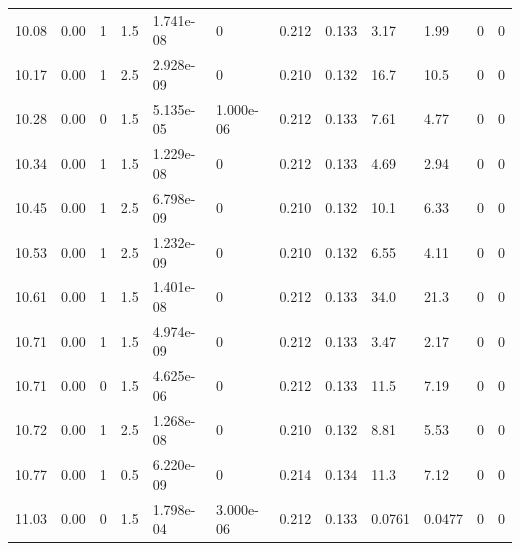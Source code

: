 \documentclass[preview]{standalone}
\begin{document}
{{{{\begin{tabular}{L{1.2cm}C{1.2cm} C{0.3cm}C{0.5cm} C{1.4cm}C{1.4cm} C{1.4cm}C{1.4cm} C{1.6cm}C{1.6cm} C{1.6cm}C{1.6cm}}
  10.08  &  0.00  & 1     & 1.5 &  1.741e-08  & 0  &  0.212&   0.133& 3.17 & 1.99   &  0 & 0  \\ 
  10.17  &  0.00  & 1     & 2.5 &  2.928e-09  & 0  &  0.210&   0.132& 16.7 & 10.5   &  0 & 0  \\ 
  10.28  &  0.00  & 0     & 1.5 &  5.135e-05  & 1.000e-06  &  0.212&   0.133& 7.61 & 4.77   &  0 & 0  \\ 
  10.34  &  0.00  & 1     & 1.5 &  1.229e-08  & 0  &  0.212&   0.133& 4.69 & 2.94   &  0 & 0  \\ 
  10.45  &  0.00  & 1     & 2.5 &  6.798e-09  & 0  &  0.210&   0.132& 10.1 & 6.33   &  0 & 0  \\ 
  10.53  &  0.00  & 1     & 2.5 &  1.232e-09  & 0  &  0.210&   0.132& 6.55 & 4.11   &  0 & 0  \\ 
  10.61  &  0.00  & 1     & 1.5 &  1.401e-08  & 0  &  0.212&   0.133& 34.0 & 21.3   &  0 & 0  \\ 
  10.71  &  0.00  & 1     & 1.5 &  4.974e-09  & 0  &  0.212&   0.133& 3.47 & 2.17   &  0 & 0  \\ 
  10.71  &  0.00  & 0     & 1.5 &  4.625e-06  & 0  &  0.212&   0.133& 11.5 & 7.19   &  0 & 0  \\ 
  10.72  &  0.00  & 1     & 2.5 &  1.268e-08  & 0  &  0.210&   0.132& 8.81 & 5.53   &  0 & 0  \\ 
  10.77  &  0.00  & 1     & 0.5 &  6.220e-09  & 0  &  0.214&   0.134& 11.3 & 7.12   &  0 & 0  \\ 
  11.03  &  0.00  & 0     & 1.5 &  1.798e-04  & 3.000e-06  &  0.212&   0.133& 0.0761 & 0.0477   &  0 & 0  \\ 
\hline 
\end{tabular} 

}}}}
\end{document}
